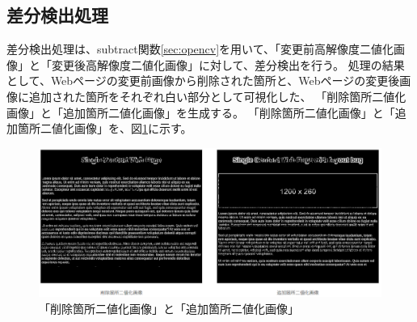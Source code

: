 \subsection{差分検出処理}\label{subsec:difference_detection_process}
差分検出処理は、subtract関数\ref{sec:opencv}を用いて、「変更前高解像度二値化画像」と「変更後高解像度二値化画像」に対して、差分検出を行う。
処理の結果として、Webページの変更前画像から削除された箇所と、Webページの変更後画像に追加された箇所をそれぞれ白い部分として可視化した、
「削除箇所二値化画像」と「追加箇所二値化画像」を生成する。
「削除箇所二値化画像」と「追加箇所二値化画像」を、図\ref{fig: img_del_add_bin_bf_af}に示す。
\begin{figure}[tp]
    \begin{center}
        \includegraphics[width=1.0\columnwidth]{image/4_img_del_add_bin_bf_af.png}
        \caption{「削除箇所二値化画像」と「追加箇所二値化画像」}
        \label{fig: img_del_add_bin_bf_af}
    \end{center}
\end{figure}


